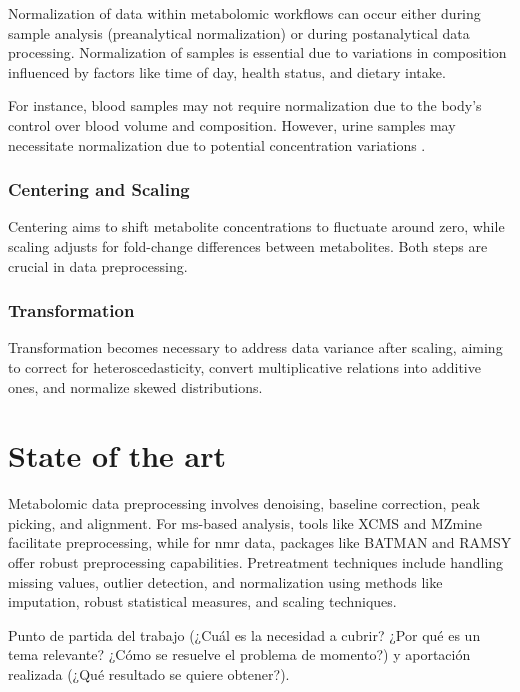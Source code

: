 \documentclass[ENG, BIB]{TFUOC}%
\begin{document}
Normalization of data within metabolomic workflows can occur either during sample analysis (preanalytical normalization) or during postanalytical data processing. Normalization of samples is essential due to variations in composition influenced by factors like time of day, health status, and dietary intake. 

For instance, blood samples may not require normalization due to the body's control over blood volume and composition. However, urine samples may necessitate normalization due to potential concentration variations \cite{ulaszewskaNutrimetabolomicsIntegrativeAction2019a}.


\subsubsection{Centering and Scaling}

 Centering aims to shift metabolite concentrations to fluctuate around zero, while scaling adjusts for fold-change differences between metabolites. Both steps are crucial in data preprocessing.

\subsubsection[Transf]{Transformation}

Transformation becomes necessary to address data variance after scaling, aiming to correct for heteroscedasticity, convert multiplicative relations into additive ones, and normalize skewed distributions.

\section{State of the art}

Metabolomic data preprocessing involves denoising, baseline correction, peak picking, and alignment. For \acrshort{ms}-based analysis, tools like XCMS and MZmine facilitate preprocessing, while for \acrshort{nmr} data, packages like BATMAN and RAMSY offer robust preprocessing capabilities. Pretreatment techniques include handling missing values, outlier detection, and normalization using methods like imputation, robust statistical measures, and scaling techniques.



Punto de partida del trabajo (¿Cuál es la necesidad a cubrir? ¿Por qué es un tema relevante? ¿Cómo se resuelve el problema de momento?) y aportación realizada (¿Qué resultado se quiere obtener?).
\end{document}
